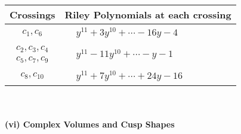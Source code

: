 \documentclass[1p]{elsarticle_modified}
\theoremstyle{definition}
\begin{document}
\begin{tabular}{m{50pt}|m{274pt}}
Crossings & \hspace{64pt}Riley Polynomials at each crossing \\
\hline $$\begin{aligned}c_{1},c_{6}\end{aligned}$$&$\begin{aligned}
&y^{11}+3 y^{10}+\cdots-16 y-4
\end{aligned}$\\
\hline $$\begin{aligned}c_{2},c_{3},c_{4}\\c_{5},c_{7},c_{9}\end{aligned}$$&$\begin{aligned}
&y^{11}-11 y^{10}+\cdots- y-1
\end{aligned}$\\
\hline $$\begin{aligned}c_{8},c_{10}\end{aligned}$$&$\begin{aligned}
&y^{11}+7 y^{10}+\cdots+24 y-16
\end{aligned}$\\
\hline
\end{tabular}\\~\\
\newpage\flushleft \textbf{(vi) Complex Volumes and Cusp Shapes}
\end{document}
